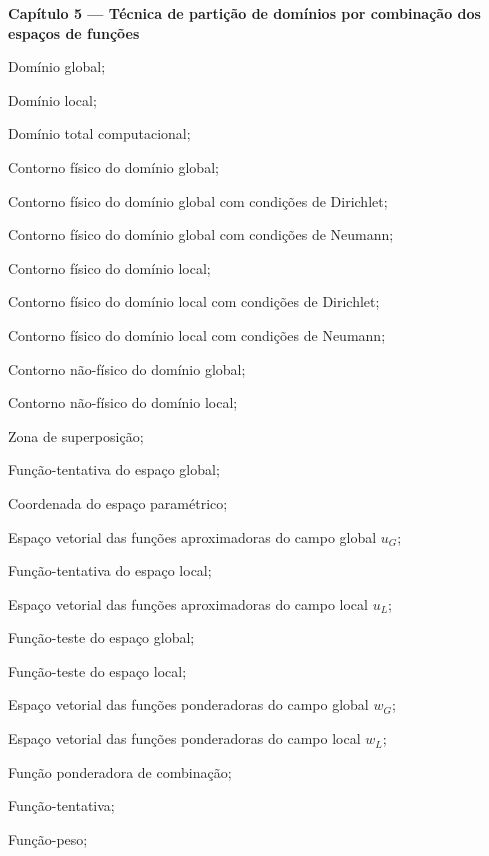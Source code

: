 \begin{simbolos}
   \vspace{0.5cm}
   \item[]\textbf{Capítulo 5 — Técnica de partição de domínios por combinação dos espaços de funções}
   \item[$\Omega_G$] Domínio global;
   \item[$\Omega_L$] Domínio local;
   \item[$\Omega$] Domínio total computacional;
   \item[$\Gamma_{G}$] Contorno físico do domínio global;
   \item[$(\Gamma_{G})_D$] Contorno físico do domínio global com condições de Dirichlet;
   \item[$(\Gamma_{G})_N$] Contorno físico do domínio global com condições de Neumann;
   \item[$\Gamma_{L}$] Contorno físico do domínio local;
   \item[$(\Gamma_{L})_D$] Contorno físico do domínio local com condições de Dirichlet;
   \item[$(\Gamma_{L})_N$] Contorno físico do domínio local com condições de Neumann;
   \item[$(\Gamma_{G})_B$] Contorno não-físico do domínio global;
   \item[$(\Gamma_{L})_B$] Contorno não-físico do domínio local;
   \item[$\Omega_B$] Zona de superposição;
   \item[$u_{G}$] Função-tentativa do espaço global;
   \item[$\xsi$] Coordenada do espaço paramétrico;
   \item[$\usolution^{G}$] Espaço vetorial das funções aproximadoras do campo global $u_{G}$;
   \item[$u_{L}$] Função-tentativa do espaço local;
   \item[$\usolution^{L}$] Espaço vetorial das funções aproximadoras do campo local $u_{L}$;
   \item[$w_{G}$] Função-teste do espaço global;
   \item[$w_{L}$] Função-teste do espaço local;
   \item[$\uweighting^G$] Espaço vetorial das funções ponderadoras do campo global $w_{G}$;
   \item[$\uweighting^L$] Espaço vetorial das funções ponderadoras do campo local $w_{L}$;
   \item[$b$] Função ponderadora de combinação;
   \item[$u$] Função-tentativa;
   \item[$w$] Função-peso;

\end{simbolos}
